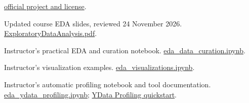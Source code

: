 \documentclass[10pt]{article}
\begin{document}
{\begin{enumerate}[label={[\arabic*]}]
\href{https://github.com/cjhutto/vaderSentiment}{official project and license}.
\item Updated course EDA slides, reviewed 24 November 2026.
\href{https://github.com/EngAndres/ud-public/blob/d938aa2acb2d33067588aece5bb9e10f6951a692/courses/data-analysis-programming/slides/ExploratoryDataAnalysis.pdf}{ExploratoryDataAnalysis.pdf}.
\item Instructor's practical EDA and curation notebook.
\href{https://github.com/EngAndres/ud-public/blob/d938aa2acb2d33067588aece5bb9e10f6951a692/courses/data-analysis-programming/notebooks/eda_data_curation.ipynb}{eda\_data\_curation.ipynb}.
\item Instructor's visualization examples.
\href{https://github.com/EngAndres/ud-public/blob/d938aa2acb2d33067588aece5bb9e10f6951a692/courses/data-analysis-programming/notebooks/eda_visualizations.ipynb}{eda\_visualizations.ipynb}.
\item Instructor's automatic profiling notebook and tool documentation.
\href{https://github.com/EngAndres/ud-public/blob/d938aa2acb2d33067588aece5bb9e10f6951a692/courses/data-analysis-programming/notebooks/eda_ydata_profiling.ipynb}{eda\_ydata\_profiling.ipynb};
\href{https://docs.profiling.ydata.ai/latest/getting-started/quickstart/}{YData Profiling quickstart}.
\end{enumerate}
}
\end{document}
